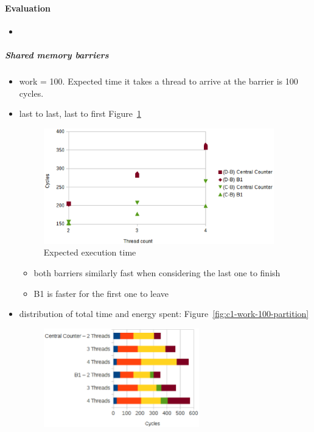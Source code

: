 \documentclass[a4paper, 10pt]{article}
\begin{document}
\paragraph{Evaluation}
\label{ssssec:analysis-modelchecking-quantitative-properties-results}
\begin{itemize}
	\item 
\end{itemize}

\subparagraph{Shared memory barriers}
\label{sssssec:analysis-modelchecking-quantitative-properties-results-shared}
\begin{itemize}
	\item work = 100. Expected time it takes a thread to arrive at the barrier is 100 cycles.
	\item last to last, last to first Figure~\ref{fig:c1-time-work-100-B-C-D}
		\begin{figure}[htbp]
			\centering
			\includegraphics[width=10cm]{charts/c1-time-work-100-B-C-D}
			\caption{Expected execution time}
			\label{fig:c1-time-work-100-B-C-D}
		\end{figure}
		\begin{itemize}
			\item both barriers similarly fast when considering the last one to finish
			\item B1 is faster for the first one to leave
		\end{itemize}
	\item distribution of total time and energy spent: Figure~\ref{fig:c1-work-100-partition}
		\begin{figure}[htbp]
			\centering
			\begin{minipage}{0.53\linewidth}
				\includegraphics[height=4.3cm]{charts/c1-time-work-100-partition}

\end{minipage}
\end{figure}
\end{itemize}
\end{document}
